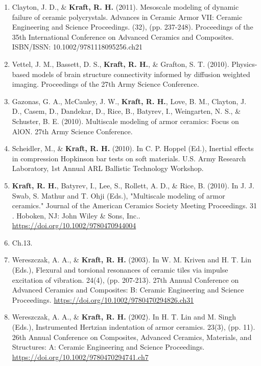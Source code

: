 \documentclass[a4paper,10pt]{article}
\begin{document}
\begin{enumerate}
  \item Clayton, J. D., \&
 \textbf{\textbf{Kraft,} R. H.} (2011). Mesoscale modeling of dynamic failure of ceramic polycrystals. Advances in Ceramic Armor VII: Ceramic Engineering and Science Proceedings. (32), (pp. 237-248). Proceedings of the 35th International Conference on Advanced Ceramics and Composites. ISBN/ISSN: 10.1002/9781118095256.ch21
  \item Vettel, J. M., Bassett, D. S., \textbf{\textbf{Kraft,} R. H.}, \&
 Grafton, S. T. (2010). Physics-based models of brain structure connectivity informed by diffusion weighted imaging. Proceedings of the 27th Army Science Conference.
  \item Gazonas, G. A., McCauley, J. W., \textbf{\textbf{Kraft,} R. H.}, Love, B. M., Clayton, J. D., Casem, D., Dandekar, D., Rice, B., Batyrev, I., Weingarten, N. S., \&
 Schuster, B. E. (2010). Multiscale modeling of armor ceramics: Focus on AlON. 27th Army Science Conference.
  \item Scheidler, M., \&
 \textbf{\textbf{Kraft,} R. H.} (2010). In C. P. Hoppel (Ed.), Inertial effects in compression Hopkinson bar tests on soft materials. U.S. Army Research Laboratory, 1st Annual ARL Ballistic Technology Workshop.
  \item \textbf{\textbf{Kraft,} R. H.}, Batyrev, I., Lee, S., Rollett, A. D., \&
 Rice, B. (2010). In J. J. Swab, S. Mathur and T. Ohji (Eds.), "Multiscale modeling of armor ceramics." Journal of the American Ceramics Society Meeting Proceedings. 31 . Hoboken, NJ: John Wiley \&
 Sons, Inc.. \url{https://doi.org/10.1002/9780470944004}
  \item Ch.13.
  \item Wereszczak, A. A., \&
 \textbf{\textbf{Kraft,} R. H.} (2003). In W. M. Kriven and H. T. Lin (Eds.), Flexural and torsional resonances of ceramic tiles via impulse excitation of vibration. 24(4), (pp. 207-213). 27th Annual Conference on Advanced Ceramics and Composites: B: Ceramic Engineering and Science Proceedings. \url{https://doi.org/10.1002/9780470294826.ch31}
  \item Wereszczak, A. A., \&
 \textbf{\textbf{Kraft,} R. H.} (2002). In H. T. Lin and M. Singh (Eds.), Instrumented Hertzian indentation of armor ceramics. 23(3), (pp. 11). 26th Annual Conference on Composites, Advanced Ceramics, Materials, and Structures: A: Ceramic Engineering and Science Proceedings. \url{https://doi.org/10.1002/9780470294741.ch7}

\end{enumerate}
\end{document}
